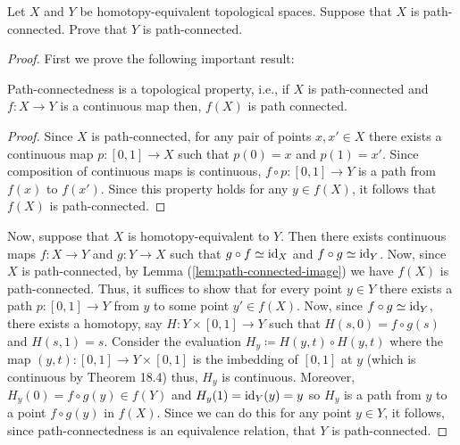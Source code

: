 \begin{problem}
Let $X$ and $Y$ be homotopy-equivalent topological spaces. Suppose that $X$
is path-connected. Prove that $Y$ is path-connected.
\end{problem}
\begin{proof}
First we prove the following important result:
\begin{lemma}
\label{lem:path-connected-image}
Path-connectedness is a topological property, i.e., if $X$ is
path-connected and $f\colon X\to Y$ is a continuous map then, $f(X)$ is
path connected.
\end{lemma}
\begin{proof}
\renewcommand\qedsymbol{$\clubsuit$}
Since $X$ is path-connected, for any pair of points $x,x'\in X$ there
exists a continuous map $p\colon [0,1]\to X$ such that $p(0)=x$ and
$p(1)=x'$. Since composition of continuous maps is continuous, $f\circ
p\colon[0,1]\to Y$ is a path from $f(x)$ to $f(x')$. Since this property
holds for any $y\in f(X)$, it follows that $f(X)$ is path-connected.
\end{proof}
Now, suppose that $X$ is homotopy-equivalent to $Y$. Then there exists
continuous maps $f\colon X\to Y$ and $g\colon Y\to X$ such that $g\circ
f\simeq\operatorname{id}_X$ and $f\circ g\simeq\operatorname{id}_Y$. Now, since $X$ is path-connected,
by Lemma (\ref{lem:path-connected-image}) we have $f(X)$ is
path-connected. Thus, it suffices to show that for every point $y\in Y$
there exists a path $p\colon [0,1]\to Y$ from $y$ to some point $y'\in
f(X)$. Now, since $f\circ g\simeq\operatorname{id}_Y$, there exists a homotopy, say
$H\colon Y\times[0,1]\to Y$ such that $H(s,0)=f\circ g(s)$ and
$H(s,1)=s$. Consider the evaluation $H_y\coloneqq H(y,t)\circ H(y,t)$ where
the map $(y,t)\colon [0,1]\to Y\times[0,1]$ is the imbedding of $[0,1]$ at
$y$ (which is continuous by Theorem 18.4) thus, $H_y$ is
continuous. Moreover, $H_y(0)=f\circ g(y)\in f(Y)$ and
$H_y(1)=\operatorname{id}_Y(y)=y$ so $H_y$ is a path from $y$ to a point $f\circ g(y)$ in
$f(X)$. Since we can do this for any point $y\in Y$, it follows, since
path-connectedness is an equivalence relation, that $Y$ is path-connected.
\end{proof}
